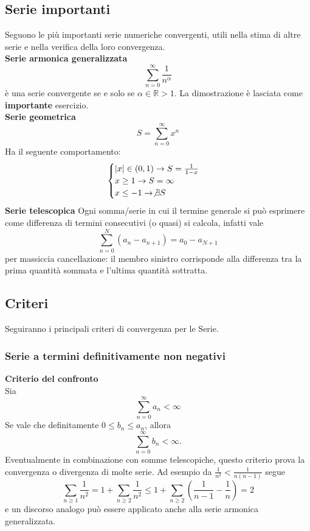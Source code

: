 \documentclass[a4paper,twoside]{article}
\newcommand{\R}{\mathbb{R}}
\theoremstyle{definition}
\numberwithin{theorem}{section}
\begin{document}
    \subsection{Serie importanti}
Seguono le più importanti serie numeriche convergenti, utili nella stima di altre serie e nella verifica della loro convergenza.\\
\textbf{Serie armonica generalizzata}
$$\sum_{n=0}^{\infty}\frac{1}{n^\alpha}$$
è una serie convergente se e solo se
$\alpha\in\R>1$. La dimostrazione è lasciata come \textbf{importante} esercizio.
\\
\textbf{Serie geometrica}
$$S=\sum_{n=0}^{\infty}x^n$$
Ha il seguente comportamento:
\begin{equation*}
\begin{cases}
    |x|\in(0,1) \rightarrow S=\frac{1}{1-x}
    \\x \geq 1 \rightarrow S=\infty
    \\x\leq -1 \rightarrow \not\exists S
    
\end{cases}
\end{equation*}
\textbf{Serie telescopica}
Ogni somma/serie in cui il termine generale si può esprimere come differenza di termini consecutivi (o quasi) si calcola, infatti vale
$$\sum_{n=0}^{N}\left(a_n - a_{n+1}\right) = a_0 - a_{N+1}$$
per massiccia cancellazione: il membro sinistro corrisponde alla differenza tra la prima quantità sommata e l'ultima quantità sottratta.

\subsection{Criteri}
Seguiranno i principali criteri di convergenza per le Serie.
\subsubsection{Serie a termini definitivamente non negativi}
\textbf{Criterio del confronto} \\
Sia
$$\sum_{n=0}^{\infty}a_n<\infty$$
Se vale che definitamente $0\leq b_n\leq a_n$, allora
$$\sum_{n=0}^{\infty}b_n<\infty.$$
Eventualmente in combinazione con somme telescopiche, questo criterio prova la convergenza o divergenza di molte serie. Ad esempio da $\frac{1}{n^2}<\frac{1}{n(n-1)}$ segue 
$$ \sum_{n\geq 1}\frac{1}{n^2} = 1+\sum_{n\geq 2}\frac{1}{n^2} \leq 1+\sum_{n\geq 2}\left(\frac{1}{n-1}-\frac{1}{n}\right) = 2 $$
e un discorso analogo può essere applicato anche alla serie armonica generalizzata.\\
\end{document}
